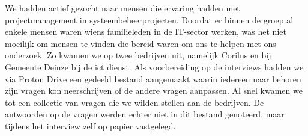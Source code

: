 \documentclass{article}
\begin{document}
We hadden actief gezocht naar mensen die ervaring hadden met projectmanagement in systeembeheerprojecten.
Doordat er binnen de groep al enkele mensen waren wiens familieleden in de IT-sector werken, was het niet moeilijk om mensen te vinden die bereid waren om ons te helpen met ons onderzoek.
Zo kwamen we op twee bedrijven uit, namelijk Corilus en bij Gemeente Deinze bij de ict dienst. \newline
Als voorbereiding op de interviews hadden we via Proton Drive een gedeeld bestand aangemaakt waarin iedereen naar behoren zijn vragen kon neerschrijven of de andere vragen aanpassen. 
Al snel kwamen we tot een collectie van vragen die we wilden stellen aan de bedrijven.
De antwoorden op de vragen werden echter niet in dit bestand genoteerd, maar tijdens het interview zelf op papier vastgelegd.
\end{document}
